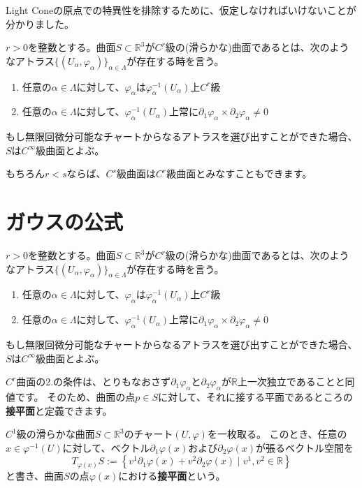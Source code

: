 Light Coneの原点での特異性を排除するために、仮定しなければいけないことが分かりました。
\begin{definition}[滑らかな曲面]
  $r>0$を整数とする。曲面$S\subset\mathbb{R}^3$が$C^r$級の(滑らかな)曲面であるとは、次のようなアトラス$\{(U_\alpha,\varphi_\alpha)\}_{\alpha\in\Lambda}$が存在する時を言う。
  \begin{enumerate}
    \item 任意の$\alpha\in\Lambda$に対して、$\varphi_\alpha$は$\varphi_\alpha^{-1}(U_\alpha)$上$C^r$級
    \item 任意の$\alpha\in\Lambda$に対して、$\varphi_\alpha^{-1}(U_\alpha)$上常に$\partial_1\varphi_\alpha\times\partial_2\varphi_\alpha\neq0$
  \end{enumerate}
  もし無限回微分可能なチャートからなるアトラスを選び出すことができた場合、$S$は$C^\infty$級曲面とよぶ。
\end{definition}

もちろん$r<s$ならば、$C^s$級曲面は$C^r$級曲面とみなすこともできます。



\section{ガウスの公式}

\begin{definition}[滑らかな曲面:再掲]
  $r>0$を整数とする。曲面$S\subset\mathbb{R}^3$が$C^r$級の(滑らかな)曲面であるとは、次のようなアトラス$\{(U_\alpha,\varphi_\alpha)\}_{\alpha\in\Lambda}$が存在する時を言う。
  \begin{enumerate}
    \item 任意の$\alpha\in\Lambda$に対して、$\varphi_\alpha$は$\varphi_\alpha^{-1}(U_\alpha)$上$C^r$級
    \item 任意の$\alpha\in\Lambda$に対して、$\varphi_\alpha^{-1}(U_\alpha)$上常に$\partial_1\varphi_\alpha\times\partial_2\varphi_\alpha\neq0$
  \end{enumerate}
  もし無限回微分可能なチャートからなるアトラスを選び出すことができた場合、$S$は$C^\infty$級曲面とよぶ。
\end{definition}

$C^r$曲面の2.の条件は、とりもなおさず$\partial_1\varphi_\alpha$と$\partial_2\varphi_\alpha$が$\mathbb{R}$上一次独立であることと同値です。
そのため、曲面の点$p\in S$に対して、それに接する平面であるところの\textbf{接平面}と定義できます。
\begin{definition}[接平面]
  $C^1$級の滑らかな曲面$S\subset\mathbb{R}^3$のチャート$(U,\varphi)$を一枚取る。
  このとき、任意の$x\in\varphi^{-1}(U)$に対して、ベクトル$\partial_1\varphi(x)$および$\partial_2\varphi(x)$が張るベクトル空間を
  \[
    T_{\varphi(x)}S:=\left\{v^1\partial_1\varphi(x)+v^2\partial_2\varphi(x)\mid v^1,v^2\in\mathbb{R}\right\}
  \]
  と書き、曲面$S$の点$\varphi(x)$における\textbf{接平面}という。
\end{definition}

